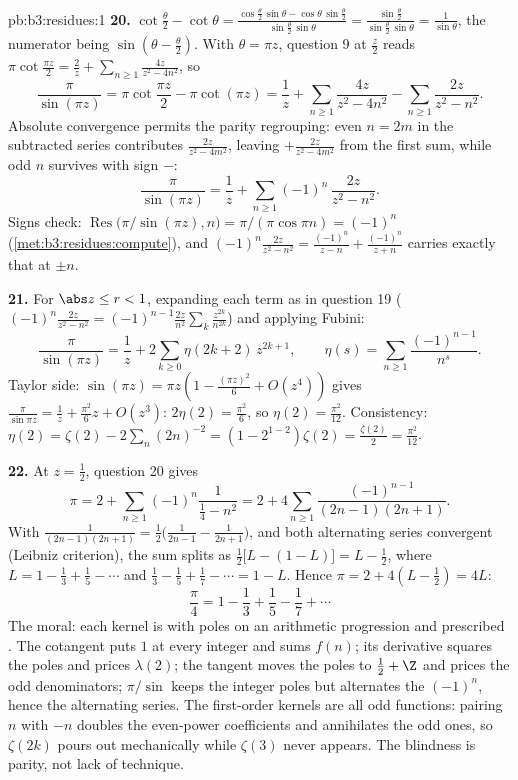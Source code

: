 \begin{solution}{pb:b3:residues:1}
\textbf{20.} $\cot\frac\theta2 - \cot\theta =
\frac{\cos\frac\theta2\,\sin\theta -
\cos\theta\,\sin\frac\theta2}{\sin\frac\theta2\,\sin\theta}
= \frac{\sin\frac\theta2}{\sin\frac\theta2\,\sin\theta} =
\frac1{\sin\theta}$, the numerator being $\sin(\theta -
\frac\theta2)$. With $\theta = \pi z$, question 9 at
$\frac z2$ reads $\pi\cot\frac{\pi z}2 = \frac2z +
\sum_{n\geq1}\frac{4z}{z^2 - 4n^2}$, so
\[
\frac{\pi}{\sin(\pi z)}
= \pi\cot\frac{\pi z}2 - \pi\cot(\pi z)
= \frac1z + \sum_{n\geq1}\frac{4z}{z^2 - 4n^2}
- \sum_{n\geq1}\frac{2z}{z^2 - n^2} .
\]
Absolute convergence permits the parity regrouping: even $n
= 2m$ in the subtracted series contributes
$\frac{2z}{z^2-4m^2}$, leaving $+\frac{2z}{z^2-4m^2}$ from
the first sum, while odd $n$ survives with sign $-$:
\[
\frac{\pi}{\sin(\pi z)} = \frac1z +
\sum_{n\geq1}(-1)^n\,\frac{2z}{z^2 - n^2} .
\]
Signs check: $\operatorname{Res}\bigl(\pi/\sin(\pi z),
n\bigr) = \pi/(\pi\cos\pi n) = (-1)^n$
(\cref{met:b3:residues:compute}), and $(-1)^n\frac{2z}{z^2 -
n^2} = \frac{(-1)^n}{z-n} + \frac{(-1)^n}{z+n}$ carries
exactly that  at $\pm n$.

\textbf{21.} For $\abs z \leq r < 1$, expanding each term as
in question 19 ($(-1)^n\frac{2z}{z^2-n^2} =
(-1)^{n-1}\frac{2z}{n^2}\sum_k\frac{z^{2k}}{n^{2k}}$) and
applying Fubini:
\[
\frac{\pi}{\sin(\pi z)} = \frac1z +
2\sum_{k\geq0}\eta(2k+2)\,z^{2k+1},
\qquad
\eta(s) = \sum_{n\geq1}\frac{(-1)^{n-1}}{n^s} .
\]
Taylor side: $\sin(\pi z) = \pi z(1 - \frac{(\pi z)^2}6 +
O(z^4))$ gives $\frac\pi{\sin\pi z} = \frac1z +
\frac{\pi^2}6z + O(z^3)$: $2\eta(2) = \frac{\pi^2}6$, so
$\eta(2) = \frac{\pi^2}{12}$. Consistency: $\eta(2) =
\zeta(2) - 2\sum_n(2n)^{-2} = (1 - 2^{1-2})\zeta(2) =
\frac{\zeta(2)}2 = \frac{\pi^2}{12}$.

\textbf{22.} At $z = \frac12$, question 20 gives
\[
\pi = 2 + \sum_{n\geq1}(-1)^n\frac{1}{\frac14 - n^2}
= 2 + 4\sum_{n\geq1}\frac{(-1)^{n-1}}{(2n-1)(2n+1)} .
\]
With $\frac1{(2n-1)(2n+1)} = \frac12\bigl(\frac1{2n-1} -
\frac1{2n+1}\bigr)$, and both alternating series convergent
(Leibniz criterion), the sum splits as $\frac12\bigl[L -
(1 - L)\bigr] = L - \frac12$, where $L = 1 - \frac13 +
\frac15 - \cdots$ and $\frac13 - \frac15 + \frac17 - \cdots
= 1 - L$. Hence $\pi = 2 + 4(L - \frac12) = 4L$:
\[
\frac\pi4 = 1 - \frac13 + \frac15 - \frac17 + \cdots
\]
The moral: each kernel is  with poles on an
arithmetic progression and prescribed . The
cotangent puts  $1$ at every integer and sums
$f(n)$; its derivative squares the poles and prices
$\lambda(2)$; the tangent moves the poles to $\frac12 + \Z$
and prices the odd denominators; $\pi/\sin$ keeps the
integer poles but alternates the  $(-1)^n$, hence
the alternating series. The first-order kernels are all
odd functions: pairing $n$ with $-n$ doubles the even-power
coefficients and annihilates the odd ones, so $\zeta(2k)$
pours out mechanically while $\zeta(3)$ never appears. The
blindness is parity, not lack of technique.


\end{solution}
